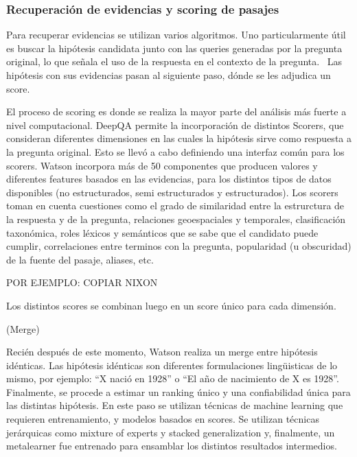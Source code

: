 \bigskip

\subsubsection{Recuperaci\'on de evidencias y scoring de pasajes}

Para recuperar evidencias se utilizan varios algoritmos. Uno
particularmente \'util es buscar la hip\'otesis candidata junto con las
queries generadas por la pregunta original, lo que se\~nala el uso de
la respuesta en el contexto de la pregunta. \ Las hip\'otesis con sus
evidencias pasan al siguiente paso, d\'onde se les adjudica un score. 

El proceso de scoring es donde se realiza la mayor parte del an\'alisis
m\'as fuerte a nivel computacional. DeepQA permite la incorporaci\'on
de distintos Scorers, que consideran diferentes dimensiones en las
cuales la hip\'otesis sirve como respuesta a la pregunta original. Esto
se llev\'o a cabo definiendo una interfaz com\'un para los scorers.
Watson incorpora m\'as de 50 componentes que producen valores y
diferentes features basados en las evidencias, para los distintos tipos
de datos disponibles (no estructurados, semi estructurados y
estructurados). Los scorers toman en cuenta cuestiones como el grado de
similaridad entre la estrurctura de la respuesta y de la pregunta,
relaciones geoespaciales y temporales, clasificaci\'on taxon\'omica,
roles l\'exicos y sem\'anticos que se sabe que el candidato puede
cumplir, correlaciones entre terminos con la pregunta, popularidad (u
obscuridad) de la fuente del pasaje, aliases, etc.

POR EJEMPLO: COPIAR NIXON

Los distintos scores se combinan luego en un score \'unico para cada
dimensi\'on.

(Merge)

Reci\'en despu\'es de este momento, Watson realiza un merge entre
hip\'otesis id\'enticas. Las hip\'otesis id\'enticas son diferentes
formulaciones ling\"uisticas de lo mismo, por ejemplo:
{\textquotedblleft}X naci\'o en 1928{\textquotedblright} o
{\textquotedblleft}El a\~no de nacimiento de X es
1928{\textquotedblright}. Finalmente, se procede a estimar un ranking
\'unico y una confiabilidad \'unica para las distintas hip\'otesis. En
este paso se utilizan t\'ecnicas de machine learning que requieren
entrenamiento, y modelos basados en scores. Se utilizan t\'ecnicas
jer\'arquicas como mixture of experts y stacked generalization y,
finalmente, un metalearner fue entrenado para ensamblar los distintos
resultados intermedios. 


